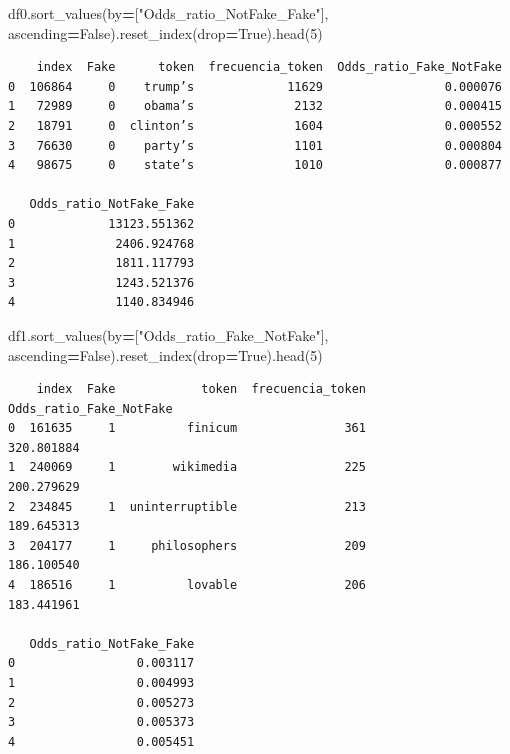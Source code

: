 \documentclass[
  11pt,
  a4paper,
]{article}
\newenvironment{Shaded}{\begin{snugshade}}{\end{snugshade}}
\newcommand{\DecValTok}[1]{\textcolor[rgb]{0.00,0.00,0.81}{#1}}
\newcommand{\NormalTok}[1]{#1}
\newcommand{\OperatorTok}[1]{\textcolor[rgb]{0.81,0.36,0.00}{\textbf{#1}}}
\newcommand{\StringTok}[1]{\textcolor[rgb]{0.31,0.60,0.02}{#1}}
\newcommand{\VariableTok}[1]{\textcolor[rgb]{0.00,0.00,0.00}{#1}}
\begin{document}
\begin{Shaded}
\begin{Highlighting}[]
\NormalTok{df0.sort\_values(by}\OperatorTok{=}\NormalTok{[}\StringTok{"Odds\_ratio\_NotFake\_Fake"}\NormalTok{], ascending}\OperatorTok{=}\VariableTok{False}\NormalTok{).reset\_index(drop}\OperatorTok{=}\VariableTok{True}\NormalTok{).head(}\DecValTok{5}\NormalTok{)}
\end{Highlighting}
\end{Shaded}

\begin{verbatim}
    index  Fake      token  frecuencia_token  Odds_ratio_Fake_NotFake  
0  106864     0    trump’s             11629                 0.000076   
1   72989     0    obama’s              2132                 0.000415   
2   18791     0  clinton’s              1604                 0.000552   
3   76630     0    party’s              1101                 0.000804   
4   98675     0    state’s              1010                 0.000877   

   Odds_ratio_NotFake_Fake  
0             13123.551362  
1              2406.924768  
2              1811.117793  
3              1243.521376  
4              1140.834946
\end{verbatim}

\begin{Shaded}
\begin{Highlighting}[]
\NormalTok{df1.sort\_values(by}\OperatorTok{=}\NormalTok{[}\StringTok{"Odds\_ratio\_Fake\_NotFake"}\NormalTok{], ascending}\OperatorTok{=}\VariableTok{False}\NormalTok{).reset\_index(drop}\OperatorTok{=}\VariableTok{True}\NormalTok{).head(}\DecValTok{5}\NormalTok{)}
\end{Highlighting}
\end{Shaded}

\begin{verbatim}
    index  Fake            token  frecuencia_token  Odds_ratio_Fake_NotFake  
0  161635     1          finicum               361               320.801884   
1  240069     1        wikimedia               225               200.279629   
2  234845     1  uninterruptible               213               189.645313   
3  204177     1     philosophers               209               186.100540   
4  186516     1          lovable               206               183.441961   

   Odds_ratio_NotFake_Fake  
0                 0.003117  
1                 0.004993  
2                 0.005273  
3                 0.005373  
4                 0.005451
\end{verbatim}
\end{document}

